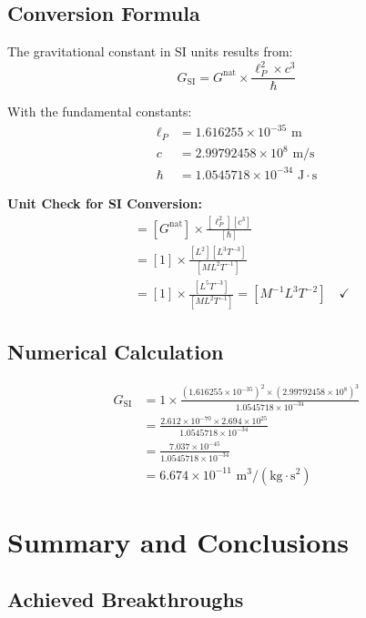 \documentclass[12pt,a4paper]{article}
\theoremstyle{definition}
\begin{document}
	\subsection{Conversion Formula}
	
	The gravitational constant in SI units results from:
	\begin{equation}
		G_{\text{SI}} = G^{\text{nat}} \times \frac{\ell_P^2 \times c^3}{\hbar}
	\end{equation}
	
	With the fundamental constants:
	\begin{align}
		\ell_P &= 1.616255 \times 10^{-35} \text{ m}\\
		c &= 2.99792458 \times 10^8 \text{ m/s}\\
		\hbar &= 1.0545718 \times 10^{-34} \text{ J}\cdot\text{s}
	\end{align}
	
	{\footnotesize
		\textbf{Unit Check for SI Conversion:}
		\begin{align}
			[G_{\text{SI}}] &= [G^{\text{nat}}] \times \frac{[\ell_P^2][c^3]}{[\hbar]} \\
			&= [1] \times \frac{[L^2][L^3T^{-3}]}{[ML^2T^{-1}]} \\
			&= [1] \times \frac{[L^5T^{-3}]}{[ML^2T^{-1}]} = [M^{-1}L^3T^{-2}] \quad \checkmark
		\end{align}
	}
	
	\subsection{Numerical Calculation}
	
	\begin{align}
		G_{\text{SI}} &= 1 \times \frac{(1.616255 \times 10^{-35})^2 \times (2.99792458 \times 10^8)^3}{1.0545718 \times 10^{-34}}\\
		&= \frac{2.612 \times 10^{-70} \times 2.694 \times 10^{25}}{1.0545718 \times 10^{-34}}\\
		&= \frac{7.037 \times 10^{-45}}{1.0545718 \times 10^{-34}}\\
		&= 6.674 \times 10^{-11} \text{ m}^3/(\text{kg} \cdot \text{s}^2)
	\end{align}
	
	\section{Summary and Conclusions}
	
	\subsection{Achieved Breakthroughs}
	
\end{document}
